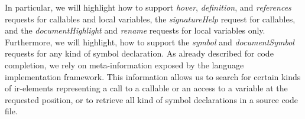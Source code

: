 \documentclass[sigplan,10pt,review,anonymous]{acmart}
\let\tableinsidecommand\relax
\begin{document}

In particular, we will highlight how to support \emph{hover}, \emph{definition},
and \emph{references} requests for callables and local variables, the
\emph{signatureHelp} request for callables, and the \emph{documentHighlight} and
\emph{rename} requests for local variables only. Furthermore, we will highlight,
how to support the \emph{symbol} and \emph{documentSymbol} requests for any kind
of symbol declaration. As already described for code completion, we rely on
meta-information exposed by the language implementation framework. This
information allows us to search for certain kinds of \ac{ir}-elements
representing a call to a callable or an access to a variable at the requested
position, or to retrieve all kind of symbol declarations in a source code file.
    
\end{document}
